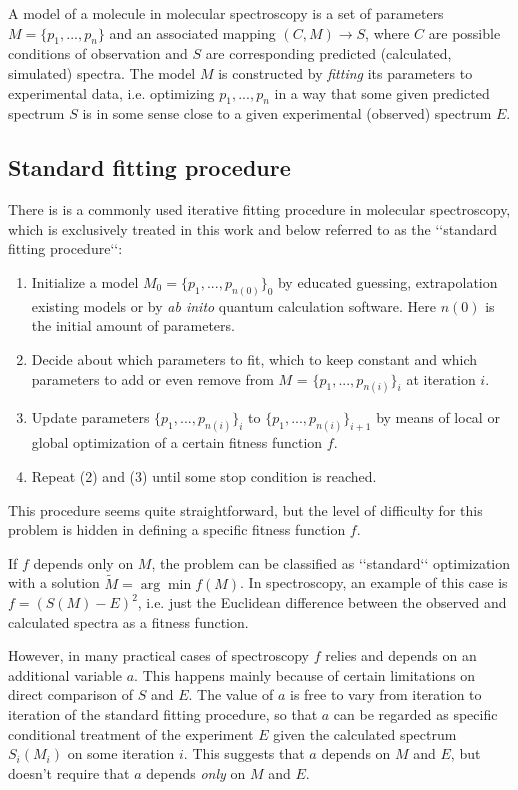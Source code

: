 \documentclass[11pt]{article}
\begin{document}
A model of a molecule in molecular spectroscopy is a set of parameters $M = \{p_1, ..., p_n\}$ and an associated mapping $(C, M) \rightarrow S$, where $C$ are possible conditions of observation and $S$ are corresponding predicted (calculated, simulated) spectra. The model $M$ is constructed by \emph{fitting} its parameters to experimental data, i.e. optimizing  $p_1, ..., p_n$ in a way that some given predicted spectrum $S$ is in some sense close to a given experimental (observed) spectrum $E$.  

\subsection{Standard fitting procedure}

There is is a commonly used iterative fitting procedure in molecular spectroscopy, which is exclusively treated in this work and below referred to as the \lq\lq{}standard fitting procedure\lq\lq{}: 

\begin{enumerate}
	\item Initialize a model $M_0 = \{{p_1}, ..., {p_{n(0)}}\}_0$ by educated guessing, extrapolation existing models or by \emph{ab inito} quantum calculation software. Here $n(0)$ is the initial amount of parameters. 
	\item Decide about which parameters to fit, which to keep constant and which parameters to add or even remove from $M$ = $\{{p_1}, ..., {p_{n(i)}}\}_i$ at iteration $i$.
	\item Update parameters $\{{p_1}, ..., {p_{n(i)}}\}_i$ to $\{{p_1}, ..., {p_{n(i)}}\}_{i + 1}$ by means of local or global optimization of a certain fitness function $f$. 
	\item Repeat (2) and (3) until some stop condition is reached.
	
\end{enumerate}

This procedure seems quite straightforward, but the level of difficulty for this problem is hidden in defining a specific fitness function $f$. 

If $f$ depends only on $M$, the problem can be classified as \lq\lq{}standard\lq\lq{} optimization with a solution $\tilde{M} = \arg\min f(M)$. In spectroscopy, an example of this case is $f = (S(M) - E)^2$, i.e. just the Euclidean difference between the observed and calculated spectra as a fitness function.

However, in many practical cases of spectroscopy $f$ relies and depends on an additional variable $a$. This happens mainly because of certain limitations on direct comparison of $S$ and $E$. The value of $a$ is free to vary from iteration to iteration of the standard fitting procedure, so that $a$ can be regarded as specific conditional treatment of the experiment $E$ given the calculated spectrum $S_i(M_i)$ on some iteration $i$. This suggests that $a$ depends on $M$ and $E$, but doesn't require that $a$ depends \emph{only} on $M$ and $E$. 
\end{document}
